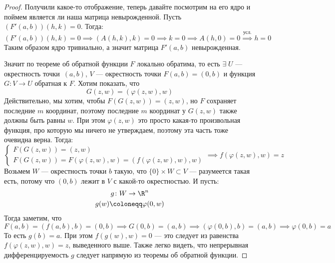 \begin{proof}
  Получили какое-то отображение, теперь давайте посмотрим на его ядро и поймем является ли наша матрица невырожденной. Пусть $(F'(a, b))(h, k) = 0$. Тогда:
  \begin{equation*}
    (F'(a, b))(h, k) = 0 \implies (A(h, k), k) = 0 \implies k = 0 \implies A(h, 0) = 0 \overset{\text{усл.}}{\implies} h = 0
  \end{equation*}
  Таким образом ядро тривиально, а значит матрица $F'(a, b)$ невырожденная.

  Значит по теореме об обратной функции $F$ локально обратима, то есть $\exists\; U$ --- окрестность точки~$(a, b)$, $V$ --- окрестность точки $F(a, b) = (0, b)$ и функция $G\colon V \to U$ обратная к $F$. Хотим показать, что
  \begin{equation*}
    G(z, w) = (\varphi(z, w), w)
  \end{equation*}
  Действительно, мы хотим, чтобы $F(G(z, w)) = (z, w)$, но $F$ сохраняет последние $m$ координат, поэтому последние $m$ координат у $G(z, w)$ также должны быть равны $w$. При этом $\varphi(z, w)$ это просто какая-то произвольная функция, про которую мы ничего не утверждаем, поэтому эта часть тоже очевидна верна. Тогда:
  \begin{equation*}
    \begin{cases}
      F(G(z, w)) = (z ,w) \\
      F(G(z, w)) = F(\varphi(z, w), w) = (f(\varphi(z, w), w), w)
    \end{cases}
    \implies f(\varphi(z, w), w) = z
  \end{equation*}
  Возьмем $W$ --- окрестность точки $b$ такую, что $\{0\} \times W \subset V$ --- разумеется такая есть, потому что $(0, b)$ лежит в $V$ с какой-то окрестностью. И пусть:
  \begin{equation*}
    \begin{gathered}
      g\colon W \to \R^n \\
      g(w) \coloneqq \varphi(0, w)
    \end{gathered}
  \end{equation*}
  Тогда заметим, что 
  \begin{equation*}
    F(a, b) = (f(a, b), b) = (0, b) \implies G(0, b) = (a, b) \implies (\varphi(0, b), b) = (a, b) \implies \varphi(0, b) = a
  \end{equation*}
  То есть $g(b) = a$. При этом $f(g(w), w) = 0$ --- это следует из равенства $f(\varphi(z, w), w) = z$, выведенного выше. Также легко видеть, что непрерывная дифференцируемость $g$ следует напрямую из теоремы об обратной функции. 


\end{proof}
